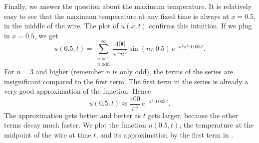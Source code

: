 \begin{example}
\begin{myfig}
\capstart
{}
\caption{Plot of the temperature $u(x,t)$ of the wire at position $x$
at time $t$ for $0 \leq t \leq 100$.  Notice the side conditions
$u(0,t)=u(1,t)=0$ and how the exponential makes the temperature decay
with time.\label{heat:wireexfig}}
\end{myfig}

Finally, we answer the question about the maximum temperature.  It is
relatively easy to see
that the maximum temperature at any fixed time is always at $x=0.5$, in
the middle of the wire.  The plot of $u(x,t)$ confirms this intuition.
If we plug in $x=0.5$, we get
\begin{equation*}
u(0.5,t) = 
\sum_{\substack{n=1 \\ n \text{ odd}}}^\infty
\frac{400}{\pi^3 n^3}
\sin (n \pi\, 0.5 )
\, e^{-n^2 \pi^2 \, 0.003 \, t} .
\end{equation*}
For $n=3$ and higher (remember $n$ is only odd), the terms
of the series
are insignificant compared to the first term.
The first term in the series is already a very good approximation
of the function.  
Hence 
\begin{equation*}
u(0.5,t) \approx
\frac{400}{\pi^3}
\, e^{-\pi^2 \, 0.003 \, t} .
\end{equation*}
The approximation gets better and better as $t$ gets larger,
because the other
terms decay much faster.
We plot the function $u(0.5,t)$, the temperature at the midpoint of the wire
at time $t$, and its approximation by the first term
in .

\begin{myfig}
\capstart
{}
\caption{Temperature at the midpoint of the wire (the bottom curve),
and the approximation of this temperature by using only the first term in
the series (top curve).\label{heat:wireexmaxfig}}
\end{myfig}


\end{example}
